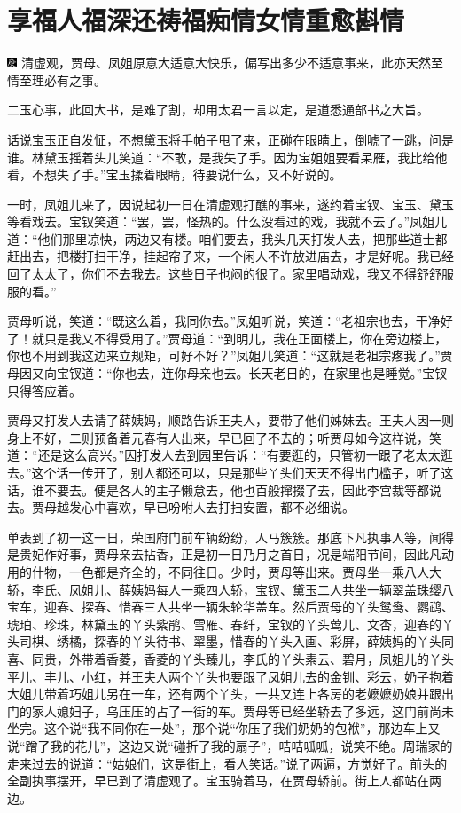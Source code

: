 

\chapter{享福人福深还祷福\hspace{.5em}痴情女情重愈斟情}

{\includegraphics[width=3mm]{../Images/00004} \kaishu 清虚观，贾母、凤姐原意大适意大快乐，偏写出多少不适意事来，此亦天然至情至理必有之事。}

{二玉心事，此回大书，是难了割，却用太君一言以定，是道悉通部书之大旨。}

话说宝玉正自发怔，不想黛玉将手帕子甩了来，正碰在眼睛上，倒唬了一跳，问是谁。林黛玉摇着头儿笑道：``不敢，是我失了手。因为宝姐姐要看呆雁，我比给他看，不想失了手。''宝玉揉着眼睛，待要说什么，又不好说的。

一时，凤姐儿来了，因说起初一日在清虚观打醮的事来，遂约着宝钗、宝玉、黛玉等看戏去。宝钗笑道：``罢，罢，怪热的。什么没看过的戏，我就不去了。''凤姐儿道：``他们那里凉快，两边又有楼。咱们要去，我头几天打发人去，把那些道士都赶出去，把楼打扫干净，挂起帘子来，一个闲人不许放进庙去，才是好呢。我已经回了太太了，你们不去我去。这些日子也闷的很了。家里唱动戏，我又不得舒舒服服的看。''

贾母听说，笑道：``既这么着，我同你去。''凤姐听说，笑道：``老祖宗也去，干净好了！就只是我又不得受用了。''贾母道：``到明儿，我在正面楼上，你在旁边楼上，你也不用到我这边来立规矩，可好不好？''凤姐儿笑道：``这就是老祖宗疼我了。''贾母因又向宝钗道：``你也去，连你母亲也去。长天老日的，在家里也是睡觉。''宝钗只得答应着。

贾母又打发人去请了薛姨妈，顺路告诉王夫人，要带了他们姊妹去。王夫人因一则身上不好，二则预备着元春有人出来，早已回了不去的；听贾母如今这样说，笑道：``还是这么高兴。''因打发人去到园里告诉：``有要逛的，只管初一跟了老太太逛去。''这个话一传开了，别人都还可以，只是那些丫头们天天不得出门槛子，听了这话，谁不要去。便是各人的主子懒怠去，他也百般撺掇了去，因此李宫裁等都说去。贾母越发心中喜欢，早已吩咐人去打扫安置，都不必细说。

单表到了初一这一日，荣国府门前车辆纷纷，人马簇簇。那底下凡执事人等，闻得是贵妃作好事，贾母亲去拈香，正是初一日乃月之首日，况是端阳节间，因此凡动用的什物，一色都是齐全的，不同往日。少时，贾母等出来。贾母坐一乘八人大轿，李氏、凤姐儿、薛姨妈每人一乘四人轿，宝钗、黛玉二人共坐一辆翠盖珠缨八宝车，迎春、探春、惜春三人共坐一辆朱轮华盖车。然后贾母的丫头鸳鸯、鹦鹉、琥珀、珍珠，林黛玉的丫头紫鹃、雪雁、春纤，宝钗的丫头莺儿、文杏，迎春的丫头司棋、绣橘，探春的丫头待书、翠墨，惜春的丫头入画、彩屏，薛姨妈的丫头同喜、同贵，外带着香菱，香菱的丫头臻儿，李氏的丫头素云、碧月，凤姐儿的丫头平儿、丰儿、小红，并王夫人两个丫头也要跟了凤姐儿去的金钏、彩云，奶子抱着大姐儿带着巧姐儿另在一车，还有两个丫头，一共又连上各房的老嬷嬷奶娘并跟出门的家人媳妇子，乌压压的占了一街的车。贾母等已经坐轿去了多远，这门前尚未坐完。这个说``我不同你在一处''，那个说``你压了我们奶奶的包袱''，那边车上又说``蹭了我的花儿''，这边又说``碰折了我的扇子''，咭咭呱呱，说笑不绝。周瑞家的走来过去的说道：``姑娘们，这是街上，看人笑话。''说了两遍，方觉好了。前头的全副执事摆开，早已到了清虚观了。宝玉骑着马，在贾母轿前。街上人都站在两边。

